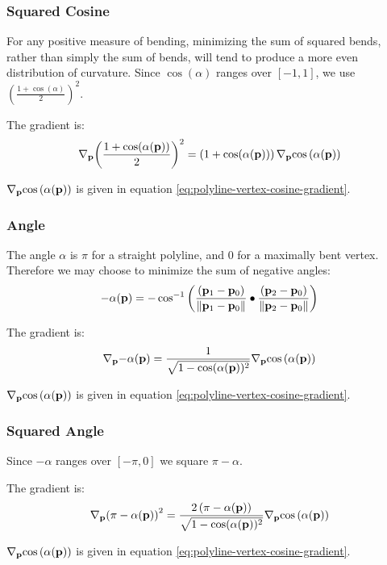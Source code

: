 
\subsubsection{Squared Cosine}
\label{sec:polyline-vertex-squared-cosine}

For any positive measure of bending,
minimizing the sum of squared bends,
rather than simply the sum of bends,
will tend to produce a more even distribution of curvature.
Since $\cos(\alpha)$ ranges over $[-1,1]$,
we use $\left( \frac{1 + \cos(\alpha)}{2} \right)^2$.

The gradient is:
\begin{equation}
{\mathbf \nabla}_{{\mathbf p}}{\left( {{1 + \cos(\alpha({\mathbf p}))} \over 2} \right)^2}
=
\left( 1 + \cos(\alpha({\mathbf p})) \right)
{\mathbf \nabla}_{{\mathbf p}}{\cos\left(\alpha({\mathbf p})\right)}
\end{equation}

${\mathbf \nabla}_{{\mathbf p}}{\cos\left(\alpha({\mathbf p})\right)}$ is given
in equation \ref{eq:polyline-vertex-cosine-gradient}.


\subsubsection{Angle}
\label{sec:polyline-vertex-angle}


The angle $\alpha$ is $\pi$ for a straight polyline,
and $0$ for a maximally bent vertex.
Therefore we may choose to minimize the sum of negative angles:
\begin{equation}
-\alpha({\mathbf p}) =
-\cos^{-1} \left(
{{({\mathbf p}_1 - {\mathbf p}_0)} \over {\| {\mathbf p}_1 - {\mathbf p}_0 \|} }
\bullet
{{({\mathbf p}_2 - {\mathbf p}_0)} \over {\| {\mathbf p}_2 - {\mathbf p}_0 \|} }
\right)
\end{equation}

The gradient is:
\begin{equation}
{\mathbf \nabla}_{{\mathbf p}}{-\alpha({\mathbf p})}
=
{{1} \over {\sqrt{ 1 - \cos(\alpha({\mathbf p}))^2}}}
{\mathbf \nabla}_{{\mathbf p}}{\cos\left(\alpha({\mathbf p})\right)}
\end{equation}

${\mathbf \nabla}_{{\mathbf p}}{\cos\left(\alpha({\mathbf p})\right)}$ is given
in equation \ref{eq:polyline-vertex-cosine-gradient}.


\subsubsection{Squared Angle}
\label{sec:polyline-vertex-squared-angle}

Since $-\alpha$ ranges over $[-\pi,0]$
we square $\pi - \alpha$.

The gradient is:
\begin{equation}
{\mathbf \nabla}_{{\mathbf p}}{\left( \pi - \alpha({\mathbf p}) \right)^2}
=
{{2 \left( \pi - \alpha({\mathbf p}) \right)}
\over
{\sqrt{ 1 - \cos(\alpha({\mathbf p}))^2}}}
{\mathbf \nabla}_{{\mathbf p}}{\cos\left(\alpha({\mathbf p})\right)}
\end{equation}

${\mathbf \nabla}_{{\mathbf p}}{\cos \left( \alpha({\mathbf p}) \right)}$ is given
in equation \ref{eq:polyline-vertex-cosine-gradient}.

